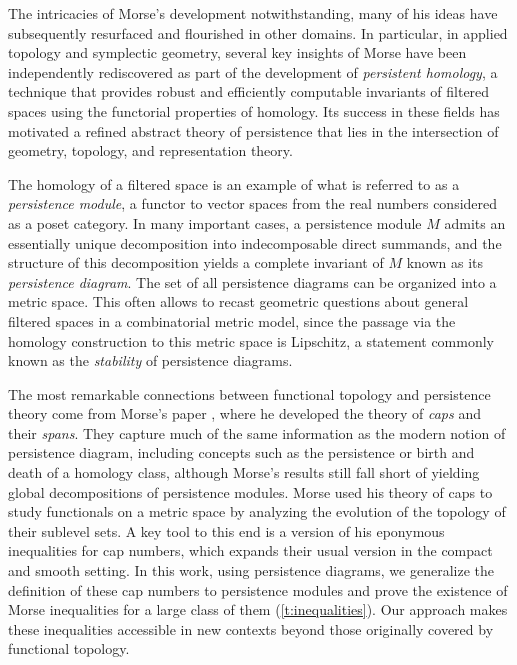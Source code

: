 The intricacies of Morse's development notwithstanding, many of his ideas have subsequently resurfaced and flourished in other domains.
In particular, in applied topology and symplectic geometry, several key insights of Morse have been independently rediscovered as part of the development of \emph{persistent homology}, a technique that provides robust and efficiently computable invariants of filtered spaces using the functorial properties of homology.
Its success in these fields has motivated a refined abstract theory of persistence that lies in the intersection of geometry, topology, and representation theory.

The homology of a filtered space is an example of what is referred to as a \emph{persistence module}, a functor to vector spaces from the real numbers considered as a poset category.
In many important cases, a persistence module $M$ admits an essentially unique decomposition into indecomposable direct summands, and the structure of this decomposition yields a complete invariant of $M$ known as its \emph{persistence diagram}.
The set of all persistence diagrams can be organized into a metric space.
This often allows to recast geometric questions about general filtered spaces in a combinatorial metric model, since the passage via the homology construction to this metric space is Lipschitz, a statement commonly known as the \emph{stability} of persistence diagrams.

The most remarkable connections between functional topology and persistence theory come from Morse's paper \cite{Morse.1940}, where he developed the theory of \emph{caps} and their \emph{spans}.
They capture much of the same information as the modern notion of persistence diagram, including concepts such as the persistence or birth and death of a homology class, although Morse's results still fall short of yielding global decompositions of persistence modules.
Morse used his theory of caps to study functionals on a metric space by analyzing the evolution of the topology of their sublevel sets.
A key tool to this end is a version of his eponymous inequalities for cap numbers, which expands their usual version in the compact and smooth setting.
In this work, using persistence diagrams, we generalize the definition of these cap numbers to persistence modules and prove the existence of Morse inequalities for a large class of them (\cref{t:inequalities}).
Our approach makes these inequalities accessible in new contexts beyond those originally covered by functional topology.

